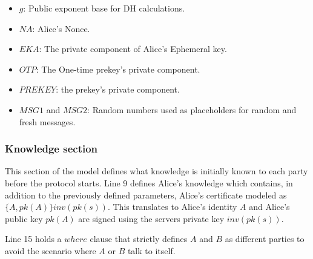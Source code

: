 \begin{itemize}
	\item $g$: Public exponent base for DH calculations.
	\item $NA$: Alice's Nonce.
	\item $EKA$: The private component of Alice's Ephemeral key.
	\item $OTP$: The One-time prekey's private component.
	\item $PREKEY$: the prekey's private component.
	\item $MSG1$ and $MSG2$: Random numbers used as placeholders for random and fresh messages.
\end{itemize}

\subsubsection{Knowledge section}
This section of the model defines what knowledge is initially known to each party before the protocol starts. Line 9 defines Alice's knowledge which contains, in addition to the previously defined parameters, Alice's certificate modeled as $\{A, pk(A)\}inv(pk(s))$. This translates to Alice's identity $A$ and Alice's public key $pk(A)$ are signed using the servers private key $inv(pk(s))$. 

Line 15 holds a $where$ clause that strictly defines $A$ and $B$ as different parties to avoid the scenario where $A$ or $B$ talk to itself.
